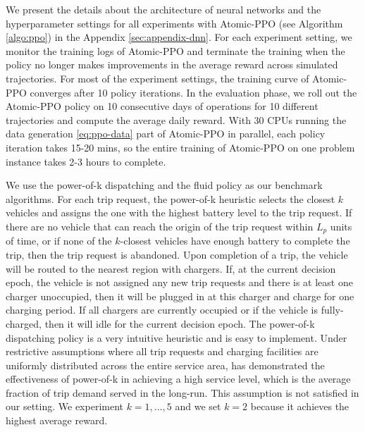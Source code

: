 We present the details about the architecture of neural networks and the hyperparameter settings for all experiments with Atomic-PPO (see Algorithm \ref{algo:ppo}) in the Appendix \ref{sec:appendix-dnn}. For each experiment setting, we monitor the training logs of Atomic-PPO and terminate the training when the policy no longer makes improvements in the average reward across simulated trajectories. For most of the experiment settings, the training curve of Atomic-PPO converges after 10 policy iterations. In the evaluation phase, we roll out the Atomic-PPO policy on 10 consecutive days of operations for 10 different trajectories and compute the average daily reward. With 30 CPUs running the data generation \eqref{eq:ppo-data} part of Atomic-PPO in parallel, each policy iteration takes 15-20 mins, so the entire training of Atomic-PPO on one problem instance takes 2-3 hours to complete.

We use the power-of-k dispatching and the fluid policy as our benchmark algorithms. For each trip request, the power-of-k heuristic selects the closest $k$ vehicles and assigns the one with the highest battery level to the trip request. If there are no vehicle that can reach the origin of the trip request within $L_p$ units of time, or if none of the $k$-closest vehicles have enough battery to complete the trip, then the trip request is abandoned. Upon completion of a trip, the vehicle will be routed to the nearest region with chargers. If, at the current decision epoch, the vehicle is not assigned any new trip requests and there is at least one charger unoccupied, then it will be plugged in at this charger and charge for one charging period. If all chargers are currently occupied or if the vehicle is fully-charged, then it will idle for the current decision epoch. The power-of-k dispatching policy is a very intuitive heuristic and is easy to implement. Under restrictive assumptions where all trip requests and charging facilities are uniformly distributed across the entire service area, \cite{varma2023electric} has demonstrated the effectiveness of power-of-k in achieving a high service level, which is the average fraction of trip demand served in the long-run. %
This assumption is not satisfied in our setting.
We experiment $k = 1, \dots, 5$ and we set $k = 2$ because it achieves the highest average reward.

